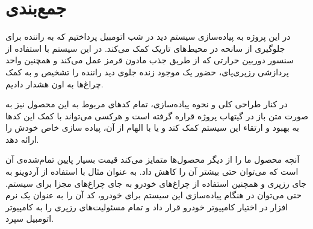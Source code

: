 \chapter{جمع‌بندی}
در این پروژه به پیاده‌سازی سیستم دید در شب اتومبیل پرداختیم که به راننده برای جلوگیری از سانحه در محیط‌های تاریک کمک می‌کند. در این سیستم با استفاده از سنسور دوربین حرارتی که از طریق جذب مادون قرمز عمل می‌کند و همچنین واحد پردازشی رزپری‌پای، حضور یک موجود زنده جلوی دید راننده را تشخیص و به کمک چرا‌غ‌ها به اون هشدار دادیم. 

در کنار طراحی کلی و نحوه پیاده‌سازی، تمام کد‌های مربوط به این محصول نیز به صورت متن باز در گیتهاب پروژه قراره گرفته است و هرکسی می‌تواند با کمک این کدها به بهبود و ارتقاء این سیستم کمک کند و یا با الهام از آن، پیاده سازی خاص خودش را ارائه دهد. 

آنچه محصول ما را از دیگر محصول‌ها متمایز می‌کند قیمت بسیار پایین تمام‌شده‌ی ‌آن است که می‌توان حتی بیشتر آن را کاهش داد. به عنوان مثال با استفاده از آردوینو به جای رزپری و همچنین استفاده از چراغ‌های خودرو به جای چراغ‌های مجزا برای سیستم. حتی می‌توان در هنگام پیاده‌سازی این سیستم برای خودرو، کد آن را به عنوان یک نرم افزار در اختیار کامپیوتر خودرو قرار داد و تمام مسئولیت‌های رزپری را به کامپیوتر اتومبیل سپرد.